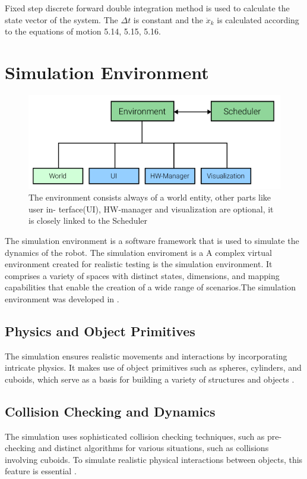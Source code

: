Fixed step discrete forward double integration method is used to calculate the state vector of the system. The $\Delta t$ is constant and the $\ddot{x}_k$ is calculated according to the equations of motion 5.14, 5.15, 5.16.

\section{Simulation Environment}
\begin{figure}[h]
	\centering
	\includegraphics[width=.5\textwidth]{Block Diagram of Simulation Environment}
	\caption{ The environment consists always of a world entity, other parts like user in-
terface(UI), HW-manager and visualization are optional, it is closely linked to
the Scheduler \cite{Bachlorsthesis}}
	\label{fig:Block diagram of the simulation environment}
\end{figure}
The simulation environment is a software framework that is used to simulate the dynamics of the robot. The simulation enviroment is a A complex virtual environment created for realistic testing is the simulation environment. It comprises a variety of spaces with distinct states, dimensions, and mapping capabilities that enable the creation of a wide range of scenarios.The simulation environment was developed in \cite{Bachlorsthesis}.
\subsection{Physics and Object Primitives}
The simulation ensures realistic movements and interactions by incorporating intricate physics. It makes use of object primitives such as spheres, cylinders, and cuboids, which serve as a basis for building a variety of structures and objects \cite{Bachlorsthesis}.
\subsection{Collision Checking and Dynamics}
The simulation uses sophisticated collision checking techniques, such as pre-checking and distinct algorithms for various situations, such as collisions involving cuboids. To simulate realistic physical interactions between objects, this feature is essential \cite{Bachlorsthesis}.
